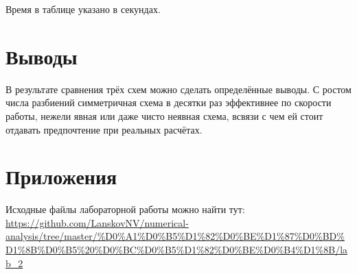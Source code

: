 \documentclass[12pt]{article}
\begin{document}
Время в таблице указано в секундах.

\section{Выводы}
В результате сравнения трёх схем можно сделать определённые выводы. С ростом числа разбиений симметричная схема в десятки раз эффективнее по скорости работы, нежели явная или даже чисто неявная схема, всвязи с чем ей стоит отдавать предпочтение при реальных расчётах.

\section{Приложения}
Исходные файлы лабораторной работы можно найти тут: \\
\url{https://github.com/LanskovNV/numerical-analysis/tree/master/%D0%A1%D0%B5%D1%82%D0%BE%D1%87%D0%BD%D1%8B%D0%B5%20%D0%BC%D0%B5%D1%82%D0%BE%D0%B4%D1%8B/lab_2}
\end{document}
